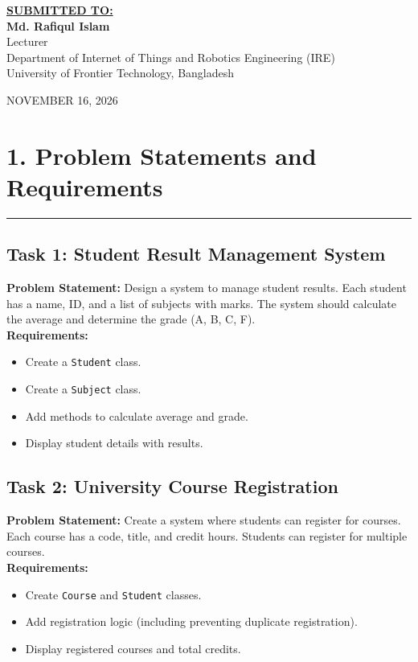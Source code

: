 \documentclass[11pt,a4paper]{article}
\begin{document}
\begin{titlepage}
    {\small \textbf{\underline{SUBMITTED TO:}}}\\[0.22cm]
    {\large \textbf{Md. Rafiqul Islam}}\\[0.14cm]
    {\small Lecturer}\\[0.1cm]
    {\footnotesize Department of Internet of Things and Robotics Engineering (IRE)}\\[0.08cm]
    {\footnotesize University of Frontier Technology, Bangladesh}

    \vfill
    {\footnotesize NOVEMBER 16, 2026}
    \vspace*{0.3cm}
\end{titlepage}

\newpage
{}

\section*{1. Problem Statements and Requirements}
\noindent\rule{\textwidth}{0.5pt}\vspace{0.15cm}

\subsection*{Task 1: Student Result Management System}
\textbf{Problem Statement:} Design a system to manage student results. Each student has a name, ID, and a list of subjects with marks. The system should calculate the average and determine the grade (A, B, C, F).\\
\textbf{Requirements:}
\begin{itemize}
    \setlength{\itemsep}{2pt}
    \item Create a \texttt{Student} class.
    \item Create a \texttt{Subject} class.
    \item Add methods to calculate average and grade.
    \item Display student details with results.
\end{itemize}

\vspace{0.25cm}
\subsection*{Task 2: University Course Registration}
\textbf{Problem Statement:} Create a system where students can register for courses. Each course has a code, title, and credit hours. Students can register for multiple courses.\\
\textbf{Requirements:}
\begin{itemize}
    \setlength{\itemsep}{2pt}
    \item Create \texttt{Course} and \texttt{Student} classes.
    \item Add registration logic (including preventing duplicate registration).
    \item Display registered courses and total credits.
\end{itemize}
\end{document}
